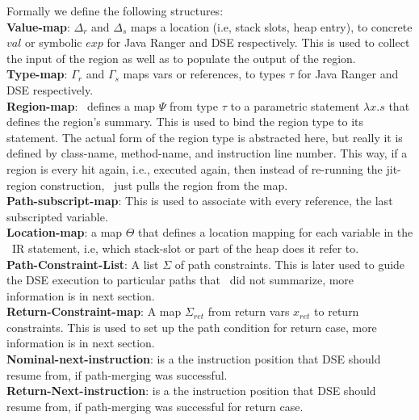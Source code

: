 Formally we define the following structures:\\
%
\textbf{Value-map}: $\Delta_r$ and $\Delta_s$ maps a location (i.e, stack slots, heap entry), to concrete $val$ or
symbolic $exp$ for Java Ranger and DSE respectively. This is used to collect the input of the region as well as to
populate the output of the region.\\
\textbf{Type-map}: $\Gamma_r$ and $\Gamma_s$ maps vars or references, to types $\tau$ for Java Ranger and DSE respectively.\\
\textbf{Region-map}: \tool\ defines a map $\Psi$ from type $\tau$  to a parametric statement $\lambda x.s$ that defines
the region\rq s summary. This is used to bind the region type to its statement. The actual form of the region type is
abstracted here, but really it is defined by class-name, method-name, and instruction line number. This way, if a region
is every hit again, i.e., executed again, then instead of re-running the jit-region construction, \toolshort\ just pulls
the region from the map.\\
\textbf{Path-subscript-map}: This is used to associate with every reference, the last subscripted variable.\\
\textbf{Location-map}: a map $\Theta$ that defines a location mapping for each variable in the \tool\ IR statement, i.e, which stack-slot or part of the heap does it refer to.\\
\textbf{Path-Constraint-List}: A list $\Sigma$ of path constraints. This is later used to guide the DSE execution to particular paths that \toolshort\ did not summarize, more information is in next section.\\
\textbf{Return-Constraint-map}: A map $\Sigma_{ret}$ from return vars $x_{ret}$ to return constraints. This is used to set up the path condition for return case, more information is in next section.\\
\textbf{Nominal-next-instruction}: is a the instruction position that DSE should resume from, if path-merging was successful.\\
\textbf{Return-Next-instruction}: is a the instruction position that DSE should resume from, if path-merging was successful for return case.


